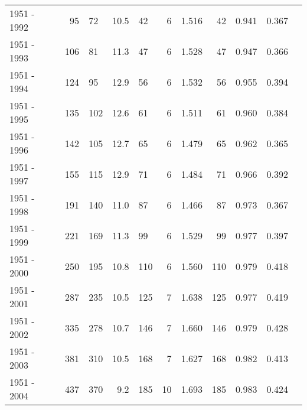 \begin{tabular}{grgrgrgrgrg}
1951 - 1992 &       95 &       72 &   10.5 &                      42 &                          6 &       1.516 &             42 &       0.941 &             0.367 \\
1951 - 1993 &      106 &       81 &   11.3 &                      47 &                          6 &       1.528 &             47 &       0.947 &             0.366 \\
1951 - 1994 &      124 &       95 &   12.9 &                      56 &                          6 &       1.532 &             56 &       0.955 &             0.394 \\
1951 - 1995 &      135 &      102 &   12.6 &                      61 &                          6 &       1.511 &             61 &       0.960 &             0.384 \\
1951 - 1996 &      142 &      105 &   12.7 &                      65 &                          6 &       1.479 &             65 &       0.962 &             0.365 \\
1951 - 1997 &      155 &      115 &   12.9 &                      71 &                          6 &       1.484 &             71 &       0.966 &             0.392 \\
1951 - 1998 &      191 &      140 &   11.0 &                      87 &                          6 &       1.466 &             87 &       0.973 &             0.367 \\
1951 - 1999 &      221 &      169 &   11.3 &                      99 &                          6 &       1.529 &             99 &       0.977 &             0.397 \\
1951 - 2000 &      250 &      195 &   10.8 &                     110 &                          6 &       1.560 &            110 &       0.979 &             0.418 \\
1951 - 2001 &      287 &      235 &   10.5 &                     125 &                          7 &       1.638 &            125 &       0.977 &             0.419 \\
1951 - 2002 &      335 &      278 &   10.7 &                     146 &                          7 &       1.660 &            146 &       0.979 &             0.428 \\
1951 - 2003 &      381 &      310 &   10.5 &                     168 &                          7 &       1.627 &            168 &       0.982 &             0.413 \\
1951 - 2004 &      437 &      370 &    9.2 &                     185 &                         10 &       1.693 &            185 &       0.983 &             0.424 \\

\end{tabular}
